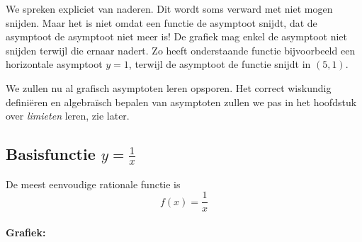 \documentclass[12pt,twoside,a4paper]{article}
\begin{document}
We spreken expliciet van naderen. Dit wordt soms verward met niet mogen snijden. Maar het is niet omdat een functie de asymptoot snijdt, dat de asymptoot de asymptoot niet meer is! De grafiek mag enkel de asymptoot niet snijden terwijl die ernaar nadert. Zo heeft onderstaande functie bijvoorbeeld een horizontale asymptoot $y=1$, terwijl de asymptoot de functie snijdt in $(5,1)$.

\begin{center}
\end{center}

We zullen nu al grafisch asymptoten leren opsporen. Het correct wiskundig definiëren en algebraïsch bepalen van asymptoten zullen we pas in het hoofdstuk over {\em limieten} leren, zie later.

\subsection{Basisfunctie $y=\frac{1}{x}$}

De meest eenvoudige rationale functie is
$$f(x) = \dfrac{1}{x}$$

\paragraph{Grafiek:}\vspace*{-1cm}
\begin{center}
\end{center}
\end{document}
